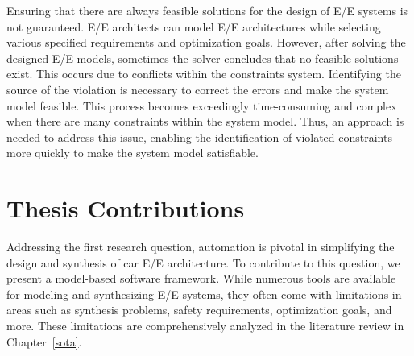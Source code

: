 \begin{itemize}
            Ensuring that there are always feasible solutions for the design of E/E systems is not guaranteed. E/E architects can model E/E architectures while selecting various specified requirements and optimization goals. However, after solving the designed E/E models, sometimes the solver concludes that no feasible solutions exist. This occurs due to conflicts within the constraints system. Identifying the source of the violation is necessary to correct the errors and make the system model feasible. This process becomes exceedingly time-consuming and complex when there are many constraints within the system model. Thus, an approach is needed to address this issue, enabling the identification of violated constraints more quickly to make the system model satisfiable.     
             
        
        
    \end{itemize}
    
    
    
    
    
    
    
    
    
    \section{Thesis Contributions}
    
    	Addressing the first research question, automation is pivotal in simplifying the design and synthesis of car E/E architecture. To contribute to this question, we present a model-based software framework. While numerous tools are available for modeling and synthesizing E/E systems, they often come with limitations in areas such as synthesis problems, safety requirements, optimization goals, and more. These limitations are comprehensively analyzed in the literature review in Chapter~\ref{sota}. 
    	
